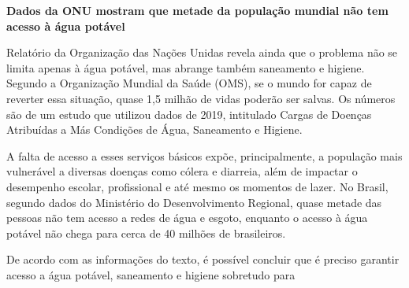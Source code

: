 \begin{myquote}



\textbf{Dados da ONU mostram que metade da população mundial não tem acesso à água potável}

Relatório da Organização das Nações Unidas revela ainda que o problema não se
limita apenas à água potável, mas abrange também saneamento e higiene. Segundo
a Organização Mundial da Saúde (OMS), se o mundo for capaz de reverter essa
situação, quase 1,5 milhão de vidas poderão ser salvas. Os números são de um
estudo que utilizou dados de 2019, intitulado Cargas de Doenças Atribuídas a
Más Condições de Água, Saneamento e Higiene.

A falta de acesso a esses serviços básicos expõe, principalmente, a população
mais vulnerável a diversas doenças como cólera e diarreia, além de impactar o
desempenho escolar, profissional e até mesmo os momentos de lazer. No Brasil,
segundo dados do Ministério do Desenvolvimento Regional, quase metade das
pessoas não tem acesso a redes de água e esgoto, enquanto o acesso à água
potável não chega para cerca de 40 milhões de brasileiros.


\end{myquote}

\pagebreak

De acordo com as informações do texto, é possível concluir que é preciso 
garantir acesso a água potável, saneamento e higiene sobretudo para

